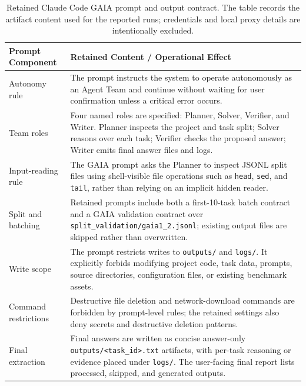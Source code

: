 \begin{table}[t]
    \centering
    \caption{Retained Claude Code GAIA prompt and output contract. The table records the artifact content used for the reported runs; credentials and local proxy details are intentionally excluded.}
    \label{tab:appendix_claude_prompt_contract}
    \footnotesize
    \setlength{\tabcolsep}{4pt}
    \renewcommand{\arraystretch}{1.08}
    \begin{tabular}{>{\raggedright\arraybackslash}p{} >{\raggedright\arraybackslash}p{}}
        \toprule
        \textbf{Prompt Component} & \textbf{Retained Content / Operational Effect} \\
        \midrule
        Autonomy rule & The prompt instructs the system to operate autonomously as an Agent Team and continue without waiting for user confirmation unless a critical error occurs. \\
        Team roles & Four named roles are specified: Planner, Solver, Verifier, and Writer. Planner inspects the project and task split; Solver reasons over each task; Verifier checks the proposed answer; Writer emits final answer files and logs. \\
        Input-reading rule & The GAIA prompt asks the Planner to inspect JSONL split files using shell-visible file operations such as \texttt{head}, \texttt{sed}, and \texttt{tail}, rather than relying on an implicit hidden reader. \\
        Split and batching & Retained prompts include both a first-10-task batch contract and a GAIA validation contract over \texttt{split\_validation/gaia1\_2.jsonl}; existing output files are skipped rather than overwritten. \\
        Write scope & The prompt restricts writes to \texttt{outputs/} and \texttt{logs/}. It explicitly forbids modifying project code, task data, prompts, source directories, configuration files, or existing benchmark assets. \\
        Command restrictions & Destructive file deletion and network-download commands are forbidden by prompt-level rules; the retained settings also deny secrets and destructive deletion patterns. \\
        Final extraction & Final answers are written as concise answer-only \texttt{outputs/<task\_id>.txt} artifacts, with per-task reasoning or evidence placed under \texttt{logs/}. The user-facing final report lists processed, skipped, and generated outputs. \\
        \bottomrule
    \end{tabular}
    \renewcommand{\arraystretch}{1.0}
\end{table}

